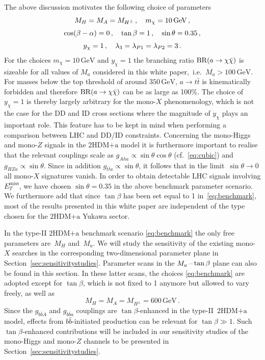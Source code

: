 \documentclass[review]{elsarticle}
\newcommand{\MET}{\ensuremath{E_T^\mathrm{miss}}\xspace}
\newcommand{\hdma}{\ensuremath{\textrm{2HDM+a}}\xspace}
\begin{document}
The above discussion motivates the following choice of parameters
\begin{gather} 
 M_H  = M_A = M_{H^\pm} \,, \quad m_\chi = 10 \, {\mathrm{GeV}} \,,\notag  \\[1mm]
\cos (\beta - \alpha) = 0\,, \quad   \tan \beta = 1\,, \quad  \sin\theta = 0.35\,, \label{eq:benchmark} \\[1mm]
y_\chi  = 1\,, \quad \lambda_3 =  \lambda_{P1} = \lambda_{P2} =3 \,. \notag 
\end{gather}
For the choices $m_\chi = 10 \, {\mathrm{GeV}}$ and $y_\chi  = 1$ the  branching ratio ${\rm BR} (a \to \chi \bar \chi)$ is sizeable for all values of $M_a$ considered in this white paper,~i.e.~$M_a > 100 \, {\mathrm{GeV}}$. For masses below the top threshold of around $350 \, {\mathrm{GeV}}$, $a \to t \bar t$ is  kinematically forbidden and therefore ${\rm BR} (a \to \chi \bar \chi)$ can be as large as 100\%.  The choice of~$y_\chi  = 1$ is thereby largely arbitrary for the mono-$X$ phenomenology, which is not the case for the DD and ID cross sections where the magnitude of $y_\chi$ plays an important role. This feature  has to be  kept in mind when performing a comparison between LHC and DD/ID constraints. Concerning the mono-Higgs and mono-$Z$ signals in the \hdma model it is furthermore important to realise that the relevant couplings scale as $g_{Aha} \propto \sin \theta \cos \theta$  (cf.~\eqref{eq:cubic}) and $g_{HZa} \propto \sin \theta$. Since in addition $g_{t \bar t a} \propto \sin \theta$,  it follows that in the limit~$\sin \theta \to 0$ all mono-$X$ signatures vanish. In order to obtain detectable LHC signals involving $\MET$, we have chosen $\sin\theta = 0.35$ in the above benchmark parameter scenario. We furthermore add that since $\tan \beta$ has been set equal to 1 in~\eqref{eq:benchmark}, most of the results presented in this white paper are independent of the type chosen for the \hdma Yukawa sector. 

In the  type-II \hdma  benchmark scenario \eqref{eq:benchmark} the only free parameters are~$M_H$ and~$M_a$. We will study the sensitivity of the existing mono-$X$ searches in the corresponding two-dimensional parameter plane in Section~\ref{sec:sensitivitystudies}. Parameter scans in the $M_a\hspace{0.5mm}$--$\hspace{0.5mm}\tan \beta$ plane can also be found in this section.  In these latter scans, the choices \eqref{eq:benchmark} are adopted except for $\tan \beta$, which is not fixed to 1 anymore but allowed to vary freely, as well as    
\begin{equation} \label{eq:matbscan}
M_H  = M_A = M_{H^\pm} =  600 \, {\mathrm{GeV}} \,.
\end{equation} 
Since the $g_{b \bar b A}$ and $g_{b \bar b a}$ couplings are $\tan \beta$-enhanced in the type-II~\hdma model,  effects from $b \bar b$-initiated production can be relevant  for $\tan \beta \gg 1$. Such $\tan \beta$-enhanced contributions will be included in our sensitivity studies of the mono-Higgs and mono-$Z$ channels to be presented in Section~\ref{sec:sensitivitystudies}. 
\end{document}
